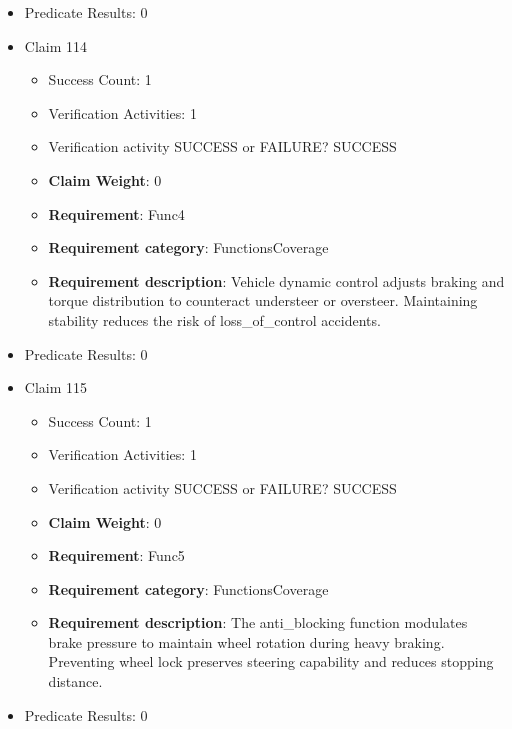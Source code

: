 \documentclass{article}
\begin{document}
\begin{itemize}
\begin{itemize}
				\end{itemize}
				
									    
				\item Predicate Results: 0

  				  \item Claim 114
				\begin{itemize}
			    	\item Success Count: 1 
			    	\item Verification Activities: 1
					\item Verification activity SUCCESS or FAILURE? SUCCESS
					\item \textbf{Claim Weight}: 0
						\item \textbf{Requirement}: Func4 
						\item \textbf{Requirement category}: FunctionsCoverage 
						\item \textbf{Requirement description}: Vehicle dynamic control adjusts braking and torque distribution to counteract understeer or oversteer. Maintaining stability reduces the risk of loss_of_control accidents.
					
				\end{itemize}
				
									    
				\item Predicate Results: 0

  				  \item Claim 115
				\begin{itemize}
			    	\item Success Count: 1 
			    	\item Verification Activities: 1
					\item Verification activity SUCCESS or FAILURE? SUCCESS
					\item \textbf{Claim Weight}: 0
						\item \textbf{Requirement}: Func5 
						\item \textbf{Requirement category}: FunctionsCoverage 
						\item \textbf{Requirement description}: The anti_blocking function modulates brake pressure to maintain wheel rotation during heavy braking. Preventing wheel lock preserves steering capability and reduces stopping distance.
					
				\end{itemize}
				
									    
				\item Predicate Results: 0


\end{itemize}
\end{document}
